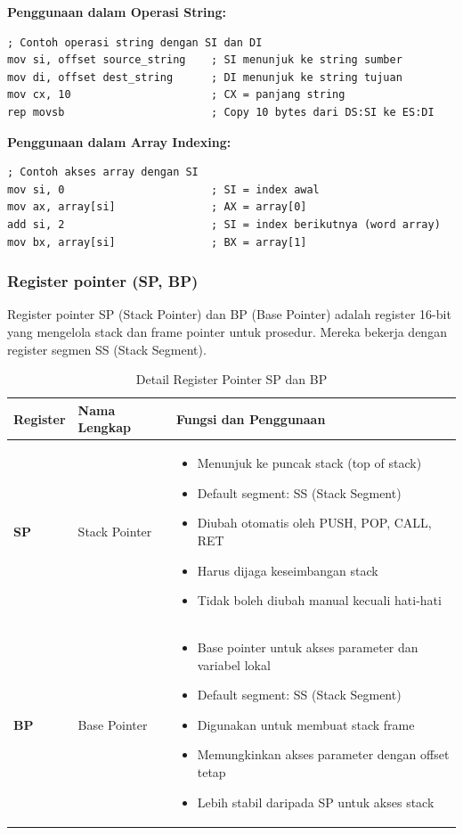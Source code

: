 \documentclass[../main.tex]{subfiles}
\begin{document}
\textbf{Penggunaan dalam Operasi String:}
\begin{lstlisting}[language={[x86masm]Assembler}, caption=Operasi String dengan SI dan DI, label=lst:string-operations]
; Contoh operasi string dengan SI dan DI
mov si, offset source_string    ; SI menunjuk ke string sumber
mov di, offset dest_string      ; DI menunjuk ke string tujuan
mov cx, 10                      ; CX = panjang string
rep movsb                       ; Copy 10 bytes dari DS:SI ke ES:DI
\end{lstlisting}

\textbf{Penggunaan dalam Array Indexing:}
\begin{lstlisting}[language={[x86masm]Assembler}, caption=Akses Array dengan SI, label=lst:array-indexing]
; Contoh akses array dengan SI
mov si, 0                       ; SI = index awal
mov ax, array[si]               ; AX = array[0]
add si, 2                       ; SI = index berikutnya (word array)
mov bx, array[si]               ; BX = array[1]
\end{lstlisting}

\subsubsection{Register pointer (SP, BP)}
Register pointer SP (Stack Pointer) dan BP (Base Pointer) adalah register 16-bit yang mengelola stack dan frame pointer untuk prosedur. Mereka bekerja dengan register segmen SS (Stack Segment).

\begin{table}[h]
\centering
\caption{Detail Register Pointer SP dan BP}
\begin{tabular}{|p{2cm}|p{4cm}|p{9cm}|}
\hline
\textbf{Register} & \textbf{Nama Lengkap} & \textbf{Fungsi dan Penggunaan} \\
\hline
\textbf{SP} & Stack Pointer & \begin{itemize}
\item Menunjuk ke puncak stack (top of stack)
\item Default segment: SS (Stack Segment)
\item Diubah otomatis oleh PUSH, POP, CALL, RET
\item Harus dijaga keseimbangan stack
\item Tidak boleh diubah manual kecuali hati-hati
\end{itemize} \\
\hline
\textbf{BP} & Base Pointer & \begin{itemize}
\item Base pointer untuk akses parameter dan variabel lokal
\item Default segment: SS (Stack Segment)
\item Digunakan untuk membuat stack frame
\item Memungkinkan akses parameter dengan offset tetap
\item Lebih stabil daripada SP untuk akses stack
\end{itemize} \\
\hline
\end{tabular}
\label{tab:pointer-registers-detail}
\end{table}
\end{document}

